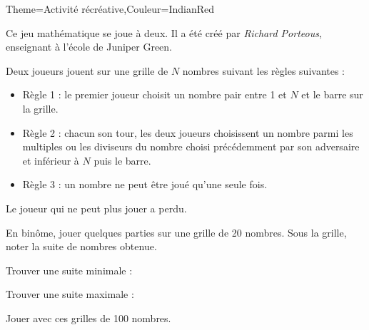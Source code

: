 \begin{Maquette}[Cours]{Theme={Activité récréative},Couleur={IndianRed}}
    

      Ce jeu mathématique se joue à deux. Il a été créé par {\it Richard Porteous}, enseignant à l'école de Juniper Green.
      
         Deux joueurs jouent sur une grille de $N$ nombres suivant les règles suivantes :
         \begin{itemize}
            \item Règle 1 : le premier joueur choisit un nombre pair entre 1 et $N$ et le barre sur la grille.
            \item Règle 2 : chacun son tour, les deux joueurs choisissent un nombre parmi les multiples ou les diviseurs du nombre choisi précédemment par son adversaire et inférieur à $N$ puis le barre.
            \item Règle 3 : un nombre ne peut être joué qu'une seule fois.
         \end{itemize}
         Le joueur qui ne peut plus jouer a perdu.
         
         En binôme, jouer quelques parties sur une grille de 20 nombres. Sous la grille, noter la suite de nombres obtenue.
         \begin{center}
            \Erathostene[Lignes=4,Colonnes=5,Hauteur=5mm,CouleurNP=White]
            \quad
            \Erathostene[Lignes=4,Colonnes=5,Hauteur=5mm,CouleurNP=White]
            \quad
            \Erathostene[Lignes=4,Colonnes=5,Hauteur=5mm,CouleurNP=White]
            \quad
            \Erathostene[Lignes=4,Colonnes=5,Hauteur=5mm,CouleurNP=White] \par \bigskip
            \pointilles \quad \pointilles  \quad \pointilles  \quad \pointilles
         \end{center}
         Trouver une suite minimale : \pointilles  \par \medskip
         Trouver une suite maximale : \pointilles
            
         Jouer avec ces grilles de 100 nombres.
         \begin{center}
            \Erathostene[Hauteur=6mm,CouleurNP=White]
            \hfill
            \Erathostene[Hauteur=6mm,CouleurNP=White]
         \end{center}


\end{Maquette}
